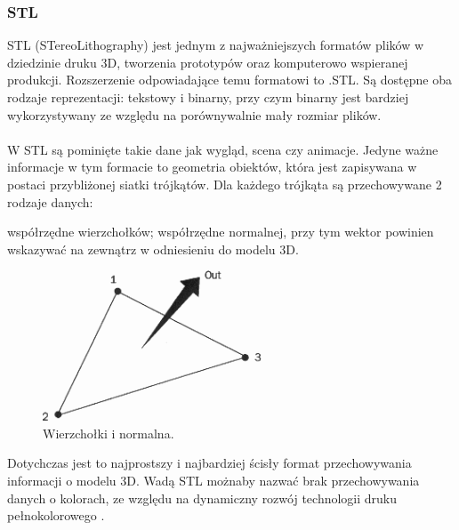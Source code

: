 \subsubsection{STL}
STL (STereoLithography) jest jednym z najważniejszych formatów plików w dziedzinie druku 3D, tworzenia prototypów oraz komputerowo wspieranej produkcji. Rozszerzenie odpowiadające temu formatowi to .STL. Są dostępne oba rodzaje reprezentacji: tekstowy i binarny, przy czym binarny jest bardziej wykorzystywany ze względu na porównywalnie mały rozmiar plików. \paragraph{} 
W STL są pominięte takie dane jak wygląd, scena czy animacje. Jedyne ważne informacje w tym formacie to geometria obiektów, która jest zapisywana w postaci przybliżonej siatki trójkątów. Dla każdego trójkąta są przechowywane 2 rodzaje danych:
\begin{itemize}
\itemi współrzędne wierzchołków;
\itemi współrzędne normalnej, przy tym wektor powinien wskazywać na zewnątrz w odniesieniu do modelu 3D.
\end{itemize}
\begin{figure}[H]
		\centering
 		\includegraphics[width=6.5cm]{vertices-and-normal.png}
    	\caption{Wierzchołki i normalna.}
 		\label{rys5}
\end{figure}
 Dotychczas jest to najprostszy i najbardziej ścisły format przechowywania informacji o modelu 3D. Wadą STL możnaby nazwać brak przechowywania danych o kolorach, ze względu na dynamiczny rozwój technologii druku pełnokolorowego \cite{stlinfo}.

